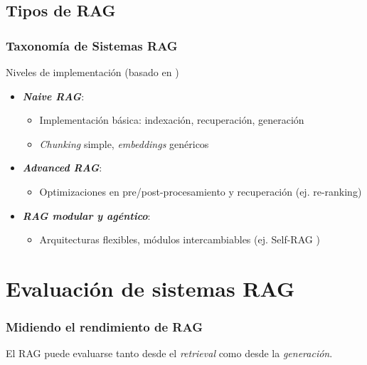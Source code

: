 \documentclass[handout]{beamer}
\begin{document}
\subsection{Tipos de RAG}
\begin{frame}
  \frametitle{Taxonomía de Sistemas RAG}
  \begin{block}{Niveles de implementación (basado en \textcite{Dai2024RetrievalAugmented})}
    \begin{itemize}
        \item \textbf{\textit{Naive RAG}}:
            \begin{itemize}
                \item Implementación básica: indexación, recuperación, generación
                \item \textit{Chunking} simple, \textit{embeddings} genéricos
            \end{itemize}
        \item \textbf{\textit{Advanced RAG}}:
            \begin{itemize}
                \item Optimizaciones en pre/post-procesamiento y recuperación (ej. re-ranking)
            \end{itemize}
        \item \textbf{\textit{RAG modular y agéntico}}:
            \begin{itemize}
                \item Arquitecturas flexibles, módulos intercambiables (ej. Self-RAG \parencite{Asai2023SelfRAG})
            \end{itemize}
    \end{itemize}
  \end{block}
\end{frame}


\section{Evaluación de sistemas RAG}
\begin{frame}
    \frametitle{Midiendo el rendimiento de RAG}
    El RAG puede evaluarse tanto desde el \textit{retrieval} como desde la \textit{generación}.
\end{frame}

\end{document}
